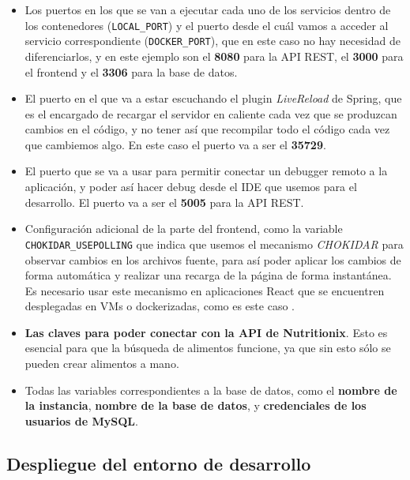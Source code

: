 \begin{itemize}
	\item Los puertos en los que se van a ejecutar cada uno de los servicios dentro de los contenedores (\verb,LOCAL_PORT,) y el puerto desde el cuál vamos a acceder al servicio correspondiente (\verb,DOCKER_PORT,), que en este caso no hay necesidad de diferenciarlos, y en este ejemplo son el \textbf{8080} para la API REST, el \textbf{3000} para el frontend y el \textbf{3306} para la base de datos.
	\item El puerto en el que va a estar escuchando el plugin \textit{LiveReload} de Spring, que es el encargado de recargar el servidor en caliente cada vez que se produzcan cambios en el código, y no tener así que recompilar todo el código cada vez que cambiemos algo. En este caso el puerto va a ser el \textbf{35729}.
	\item El puerto que se va a usar para permitir conectar un debugger remoto a la aplicación, y poder así hacer debug desde el IDE que usemos para el desarrollo. El puerto va a ser el \textbf{5005} para la API REST.
	\item Configuración adicional de la parte del frontend, como la variable \verb,CHOKIDAR_USEPOLLING, que indica que usemos el mecanismo \textit{CHOKIDAR} para observar cambios en los archivos fuente, para así poder aplicar los cambios de forma automática y realizar una recarga de la página de forma instantánea. Es necesario usar este mecanismo en aplicaciones React que se encuentren desplegadas en VMs o dockerizadas, como es este caso \cite{create-react-app:advanced-conf}.
	\item \textbf{Las claves para poder conectar con la API de Nutritionix}. Esto es esencial para que la búsqueda de alimentos funcione, ya que sin esto sólo se pueden crear alimentos a mano.
	\item Todas las variables correspondientes a la base de datos, como el \textbf{nombre de la instancia}, \textbf{nombre de la base de datos}, y \textbf{credenciales de los usuarios de MySQL}.
\end{itemize}


\subsection{Despliegue del entorno de desarrollo}


